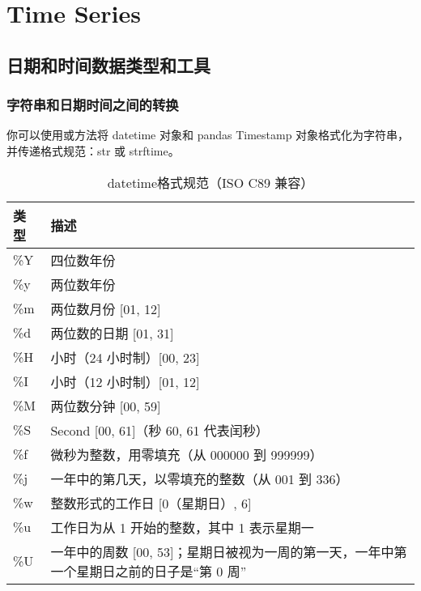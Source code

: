 \chapter{Time Series\label{ch11}}
\section{日期和时间数据类型和工具}
\subsection{字符串和日期时间之间的转换}
你可以使用或方法将 datetime 对象和 pandas Timestamp 对象格式化为字符串，并传递格式规范：str 或 strftime。

\begin{table}
    \centering
    \caption{datetime格式规范（ISO C89 兼容）}
    \label{tbl11.2}
    \begin{tabular}{ll}
        \hline
        类型  & 描述                                                  \\
        \hline
        \%Y & 四位数年份                                               \\
        \%y & 两位数年份                                               \\
        \%m & 两位数月份 [01, 12]                                      \\
        \%d & 两位数的日期 [01, 31]                                     \\
        \%H & 小时（24 小时制）[00, 23]                                  \\
        \%I & 小时（12 小时制）[01, 12]                                  \\
        \%M & 两位数分钟 [00, 59]                                      \\
        \%S & Second [00, 61]（秒 60, 61 代表闰秒）                      \\
        \%f & 微秒为整数，用零填充（从 000000 到 999999）                       \\
        \%j & 一年中的第几天，以零填充的整数（从 001 到 336）                        \\
        \%w & 整数形式的工作日 [0（星期日）, 6]                                \\
        \%u & 工作日为从 1 开始的整数，其中 1 表示星期一                            \\
        \%U & 一年中的周数 [00, 53]；星期日被视为一周的第一天，一年中第一个星期日之前的日子是“第 0 周” \\

\end{tabular}
\end{table}
